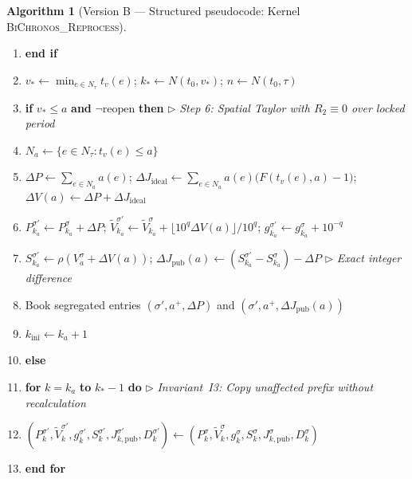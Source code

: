 \documentclass[11pt, a4paper]{article}
\theoremstyle{definition}
\newtheorem{algoritmo}[definicao]{Algorithm}
\theoremstyle{plain}
\theoremstyle{remark}
\begin{document}
\begin{algoritmo}[Version B — Structured pseudocode: Kernel \textsc{BiChronos\_Reprocess}]
\begin{enumerate}[label=\footnotesize\textbf{\arabic*:}, leftmargin=2.2em, itemsep=0.15em, topsep=0.3em]
    \item \textbf{end if}
    \item $v_* \leftarrow \min_{e \in N_\tau} t_v(e)$; \quad $k_* \leftarrow N(t_0, v_*)$; \quad $n \leftarrow N(t_0, \tau)$
    \item \textbf{if} $v_* \le a$ \textbf{and} $\neg\text{reopen}$ \textbf{then} \hfill $\triangleright$ \emph{Step 6: Spatial Taylor with $R_2 \equiv 0$ over locked period}
    \item \hspace{1.2em} $N_a \leftarrow \{e \in N_\tau : t_v(e) \le a\}$
    \item \hspace{1.2em} $\Delta P \leftarrow \sum_{e \in N_a} a(e)$; \quad $\Delta J_{\text{ideal}} \leftarrow \sum_{e \in N_a} a(e)\big(F(t_v(e), a) - 1\big)$; \quad $\Delta V(a) \leftarrow \Delta P + \Delta J_{\text{ideal}}$
    \item \hspace{1.2em} $P_{k_a}^{\sigma'} \leftarrow P_{k_a}^\sigma + \Delta P$; \quad $\tilde{V}_{k_a}^{\sigma'} \leftarrow \tilde{V}_{k_a}^\sigma + \lfloor 10^q \Delta V(a) \rfloor / 10^q$; \quad $g_{k_a}^{\sigma'} \leftarrow g_{k_a}^\sigma + 10^{-q}$
    \item \hspace{1.2em} $S_{k_a}^{\sigma'} \leftarrow \rho(V_a^\sigma + \Delta V(a))$; \quad $\Delta J_{\text{pub}}(a) \leftarrow (S_{k_a}^{\sigma'} - S_{k_a}^\sigma) - \Delta P$ \hfill $\triangleright$ \emph{Exact integer difference}
    \item \hspace{1.2em} Book segregated entries $(\sigma', a^+, \Delta P)$ and $(\sigma', a^+, \Delta J_{\text{pub}}(a))$
    \item \hspace{1.2em} $k_{\text{ini}} \leftarrow k_a + 1$
    \item \textbf{else}
    \item \hspace{1.2em} \textbf{for} $k = k_a$ \textbf{to} $k_* - 1$ \textbf{do} \hfill $\triangleright$ \emph{Invariant~I3: Copy unaffected prefix without recalculation}
    \item \hspace{2.4em} $(P_k^{\sigma'}, \tilde{V}_k^{\sigma'}, g_k^{\sigma'}, S_k^{\sigma'}, J_{k,\text{pub}}^{\sigma'}, D_k^{\sigma'}) \leftarrow (P_k^\sigma, \tilde{V}_k^\sigma, g_k^\sigma, S_k^\sigma, J_{k,\text{pub}}^\sigma, D_k^\sigma)$
    \item \hspace{1.2em} \textbf{end for}

\end{enumerate}
\end{algoritmo}
\end{document}
